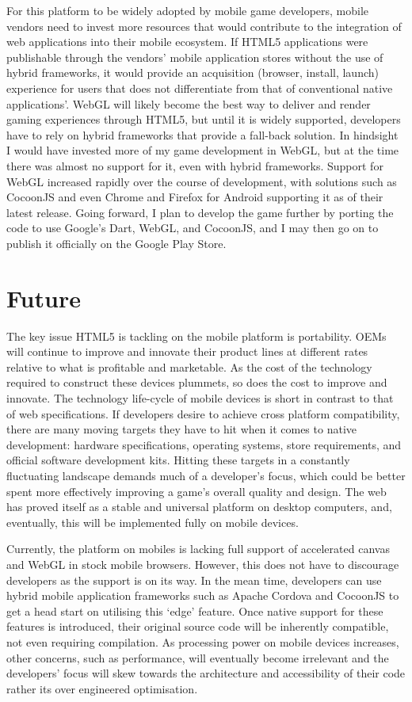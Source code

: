 \documentclass[final]{cmpreport}
\begin{document}
For this platform to be widely adopted by mobile game developers, mobile vendors need to invest more resources that would contribute to the integration of web applications into their mobile ecosystem. If HTML5 applications were publishable through the vendors' mobile application stores without the use of hybrid frameworks, it would provide an acquisition (browser, install, launch) experience for users that does not differentiate from that of conventional native applications'. WebGL will likely become the best way to deliver and render gaming experiences through HTML5, but until it is widely supported, developers have to rely on hybrid frameworks that provide a fall-back solution.
In hindsight I would have invested more of my game development in WebGL, but at the time there was almost no support for it, even with hybrid frameworks. Support for WebGL increased rapidly over the course of development, with solutions such as CocoonJS and even Chrome and Firefox for Android supporting it as of their latest release. Going forward, I plan to develop the game further by porting the code to use Google's Dart, WebGL, and CocoonJS, and I may then go on to publish it officially on the Google Play Store.

\section{Future}
The key issue HTML5 is tackling on the mobile platform is portability. OEMs will continue to improve and innovate their product lines at different rates relative to what is profitable and marketable. As the cost of the technology required to construct these devices plummets, so does the cost to improve and innovate. The technology life-cycle of mobile devices is short in contrast to that of web specifications. If developers desire to achieve cross platform compatibility, there are many moving targets they have to hit when it comes to native development: hardware specifications, operating systems, store requirements, and official software development kits. Hitting these targets in a constantly fluctuating landscape demands much of a developer's focus, which could be better spent more effectively improving a game's overall quality and design. The web has proved itself as a stable and universal platform on desktop computers, and, eventually, this will be implemented fully on mobile devices.

Currently, the platform on mobiles is lacking full support of accelerated canvas and WebGL in stock mobile browsers. However, this does not have to discourage developers as the support is on its way. In the mean time, developers can use hybrid mobile application frameworks such as Apache Cordova and CocoonJS to get a head start on utilising this `edge' feature. Once native support for these features is introduced, their original source code will be inherently compatible, not even requiring compilation. As processing power on mobile devices increases, other concerns, such as performance, will eventually become irrelevant and the developers' focus will skew towards the architecture and accessibility of their code rather its over engineered optimisation.
\end{document}

